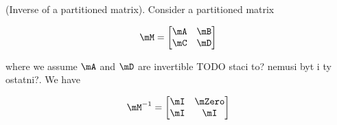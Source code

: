 \begin{thm} (Inverse of a partitioned matrix).
  Consider a partitioned matrix

  \begin{equation}
    \mM = \begin{bmatrix} \mA & \mB \\ \mC & \mD \end{bmatrix}
  \end{equation}

  where we assume $\mA$ and $\mD$ are invertible {TODO staci to? nemusi byt i
  ty ostatni?}. We have

  \begin{equation}
    \mM^{-1} = \begin{bmatrix} \mI & \mZero \\ \mI & \mI \end{bmatrix}
  \end{equation}
\end{thm}

